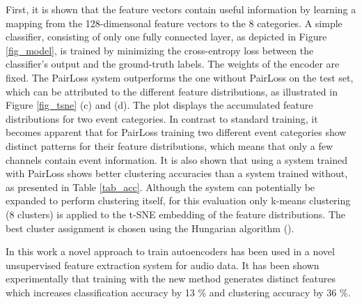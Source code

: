\documentclass{article} %
\begin{document}
First, it is shown that the feature vectors contain useful information by learning a mapping from the 128-dimensonal feature vectors to the 8 categories. A simple classifier, consisting of only one fully connected layer, as depicted in Figure \ref{fig_model}, is trained by minimizing the cross-entropy loss between the classifier's output and the ground-truth labels. The weights of the encoder are fixed. The PairLoss system outperforms the one without PairLoss on the test set, which can be attributed to the different feature distributions, as illustrated in Figure \ref{fig_tsne} (c) and (d). The plot displays the accumulated feature distributions for two event categories. In contrast to standard training, it becomes apparent that for PairLoss training two different event categories show distinct patterns for their feature distributions, which means that only a few channels contain event information. It is also shown that using a system trained with PairLoss shows better clustering accuracies than a system trained without, as presented in Table \ref{tab_acc}. Although the system can potentially be expanded to perform clustering itself, for this evaluation only k-means clustering (8 clusters) is applied to the t-SNE embedding of the feature distributions. The best cluster assignment is chosen using the Hungarian algorithm (\cite{kuhn_hungarian_1955}).

In this work a novel approach to train autoencoders has been used in a novel unsupervised feature extraction system for audio data. It has been shown experimentally that training with the new method generates distinct features which increases classification accuracy by 13 \% and clustering accuracy by 36 \%.






\end{document}
